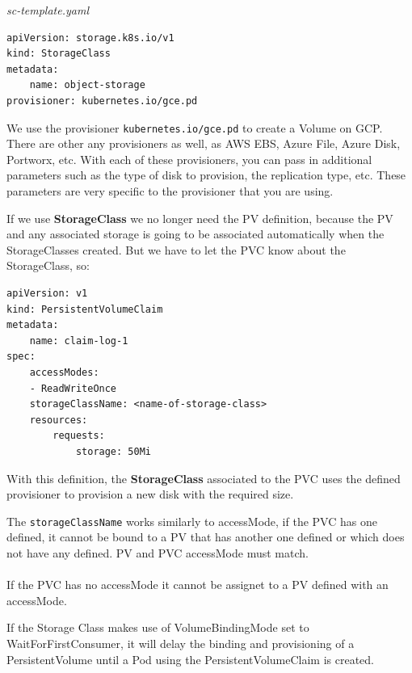 \documentclass{article}
\newenvironment{blocktemplateIII}[1]{%
    \tcolorbox[beamer,%
    noparskip,breakable,
    ,colframe=Red,%
    colbacklower=LimeGreen!75!LightGreen,%
    title=#1]}%
    {\endtcolorbox}
\newenvironment{codetemplate}[1][]{%
  \mybasecolorbox[#1]
  \itshape
}{%
  \endmybasecolorbox
}
\begin{document}
\begin{codetemplate}{sc-template.yaml}
\begin{verbatim}
apiVersion: storage.k8s.io/v1
kind: StorageClass
metadata:
    name: object-storage
provisioner: kubernetes.io/gce.pd
\end{verbatim}
\end{codetemplate}

We use the provisioner \verb|kubernetes.io/gce.pd| to create a Volume on GCP. There are other any provisioners as well, as AWS EBS, Azure File, Azure Disk, Portworx, etc. With each of these provisioners, you can pass in additional parameters such as the type of disk to provision, the replication type, etc. These parameters are very specific to the provisioner that you are using.

If we use \textbf{StorageClass} we no longer need the PV definition, because the PV and any associated storage is going to be associated automatically when the StorageClasses created. But we have to let the PVC know about the StorageClass, so:

\begin{codetemplate}{}
\begin{verbatim}
apiVersion: v1
kind: PersistentVolumeClaim
metadata:
    name: claim-log-1
spec:
    accessModes:
    - ReadWriteOnce
    storageClassName: <name-of-storage-class>
    resources:
        requests:
            storage: 50Mi
\end{verbatim}
\end{codetemplate}

With this definition, the \textbf{StorageClass} associated to the PVC uses the defined provisioner to provision a new disk with the required size.

\begin{blocktemplateIII}{WARNING}
The \verb|storageClassName| works similarly to accessMode, if the PVC has one defined, it cannot be bound to a PV that has another one defined or which does not have any defined. PV and PVC accessMode must match. 
\\\\
If the PVC has no accessMode it cannot be assignet to a PV defined with an accessMode.
\end{blocktemplateIII}

\begin{blocktemplateIII}{WARNING}
If the Storage Class makes use of VolumeBindingMode set to WaitForFirstConsumer, it will delay the binding and provisioning of a PersistentVolume until a Pod using the PersistentVolumeClaim is created.
\end{blocktemplateIII}
\end{document}
